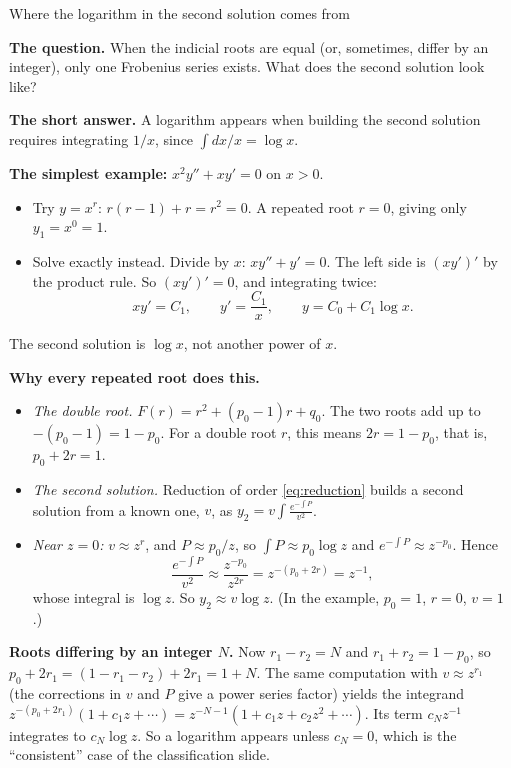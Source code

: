 \documentclass[11pt]{beamer}
\begin{document}
\begin{frame}[allowframebreaks=1.00]{Where the logarithm in the second solution comes from}
\footnotesize

\textbf{The question.} When the indicial roots are equal (or, sometimes, differ by an integer), only
one Frobenius series exists. What does the second solution look like?

\textbf{The short answer.} A logarithm appears when building the second solution requires
integrating \(1/x\), since \(\int dx/x=\log x\).

\textbf{The simplest example:} \(x^2y''+xy'=0\) on \(x>0\).
\begin{itemize}
  \item Try \(y=x^r\): \(r(r-1)+r=r^2=0\). A repeated root \(r=0\), giving only \(y_1=x^0=1\).
  \item Solve exactly instead. Divide by \(x\): \(xy''+y'=0\). The left side is \((xy')'\) by the product
        rule. So \((xy')'=0\), and integrating twice:
        \[
         xy'=C_1,\qquad y'=\frac{C_1}{x},\qquad
         y=C_0+C_1\log x.
        \]
\end{itemize}
The second solution is \(\log x\), not another power of \(x\).


\textbf{Why every repeated root does this.}
\begin{itemize}
  \item \emph{The double root.} \(F(r)=r^2+(p_0-1)r+q_0\). The two roots add up to \(-(p_0-1)=1-p_0\). For a
        double root \(r\), this means \(2r=1-p_0\), that is, \(p_0+2r=1\).
  \item \emph{The second solution.} Reduction of order \eqref{eq:reduction} builds a second solution
        from a known one, \(v\), as \(y_2=v\int\frac{e^{-\int P}}{v^2}\).
  \item \emph{Near \(z=0\):} \(v\approx z^r\), and \(P\approx p_0/z\), so \(\int P\approx p_0\log z\) and
        \(e^{-\int P}\approx z^{-p_0}\). Hence
        \[
         \frac{e^{-\int P}}{v^2}\approx\frac{z^{-p_0}}{z^{2r}}=z^{-(p_0+2r)}=z^{-1},
        \]
        whose integral is \(\log z\). So \(y_2\approx v\log z\). (In the example, \(p_0=1\), \(r=0\), \(v=1\).)
\end{itemize}
\textbf{Roots differing by an integer \(N\).} Now \(r_1-r_2=N\) and \(r_1+r_2=1-p_0\), so
\(p_0+2r_1=(1-r_1-r_2)+2r_1=1+N\). The same computation with \(v\approx z^{r_1}\) (the corrections in \(v\) and \(P\)
give a power series factor) yields the integrand \(z^{-(p_0+2r_1)}(1+c_1z+\cdots)=z^{-N-1}(1+c_1z+c_2z^2+\cdots)\). Its term \(c_Nz^{-1}\) integrates to \(c_N\log z\). So a logarithm appears
unless \(c_N=0\), which is the ``consistent'' case of the classification slide.
\end{frame}
\end{document}
